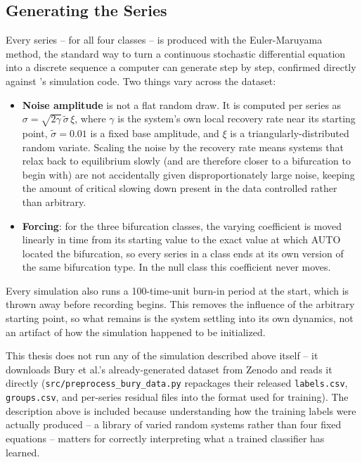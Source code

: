 \subsection{Generating the Series}

Every series -- for all four classes -- is produced with the Euler-Maruyama method, the standard way to turn a continuous stochastic differential equation into a discrete sequence a computer can generate step by step, confirmed directly against \citet{burygithub}'s simulation code. Two things vary across the dataset:

\begin{itemize}
    \item \textbf{Noise amplitude} is not a flat random draw. It is computed per series as $\sigma = \sqrt{2\gamma}\,\tilde{\sigma}\,\xi$, where $\gamma$ is the system's own local recovery rate near its starting point, $\tilde{\sigma}=0.01$ is a fixed base amplitude, and $\xi$ is a triangularly-distributed random variate. Scaling the noise by the recovery rate means systems that relax back to equilibrium slowly (and are therefore closer to a bifurcation to begin with) are not accidentally given disproportionately large noise, keeping the amount of critical slowing down present in the data controlled rather than arbitrary.
    \item \textbf{Forcing}: for the three bifurcation classes, the varying coefficient is moved linearly in time from its starting value to the exact value at which AUTO located the bifurcation, so every series in a class ends at its own version of the same bifurcation type. In the null class this coefficient never moves.
\end{itemize}

Every simulation also runs a 100-time-unit burn-in period at the start, which is thrown away before recording begins. This removes the influence of the arbitrary starting point, so what remains is the system settling into its own dynamics, not an artifact of how the simulation happened to be initialized.

This thesis does not run any of the simulation described above itself -- it downloads Bury et al.'s already-generated dataset from Zenodo and reads it directly (\texttt{src/preprocess\_bury\_data.py} repackages their released \texttt{labels.csv}, \texttt{groups.csv}, and per-series residual files into the format used for training). The description above is included because understanding how the training labels were actually produced -- a library of varied random systems rather than four fixed equations -- matters for correctly interpreting what a trained classifier has learned.

